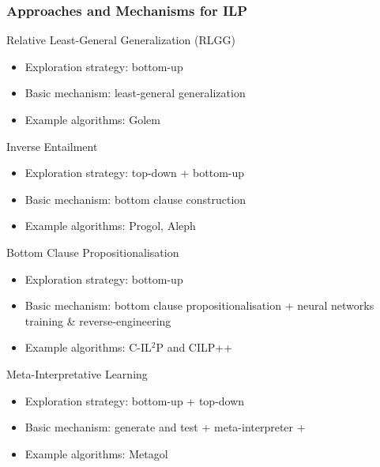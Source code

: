 \documentclass[presentation]{beamer}\mode<presentation>{\usetheme{AMSBolognaFC}}
\begin{document}
\begin{frame}[allowframebreaks]
    \frametitle{Approaches and Mechanisms for ILP}

    \begin{block}{Relative Least-General Generalization (RLGG) \cite{Buntine88}}
        \begin{itemize}
            \item Exploration strategy: bottom-up
            \item Basic mechanism: \alert{least-general generalization}
            \item Example algorithms: Golem
        \end{itemize}
    \end{block}

    \begin{block}{Inverse Entailment \cite{Muggleton95}}
        \begin{itemize}
            \item Exploration strategy: top-down + bottom-up
            \item Basic mechanism: \alert{bottom clause construction}
            \item Example algorithms: Progol, Aleph
        \end{itemize}
    \end{block}

    \begin{block}{Bottom Clause Propositionalisation \cite{Franca2014}}
        \begin{itemize}
            \item Exploration strategy: bottom-up
            \item Basic mechanism: \alert{bottom clause propositionalisation} + neural networks training \& reverse-engineering
            \item Example algorithms: C-IL$^2$P and CILP++
        \end{itemize}
    \end{block}

    \begin{block}{Meta-Interpretative Learning \cite{MuggletonLPT14}}
        \begin{itemize}
            \item Exploration strategy: bottom-up + top-down
            \item Basic mechanism: \alert{generate and test} + \alert{meta-interpreter} +
            \item Example algorithms: Metagol
        \end{itemize}
    \end{block}
\end{frame}
\end{document}
